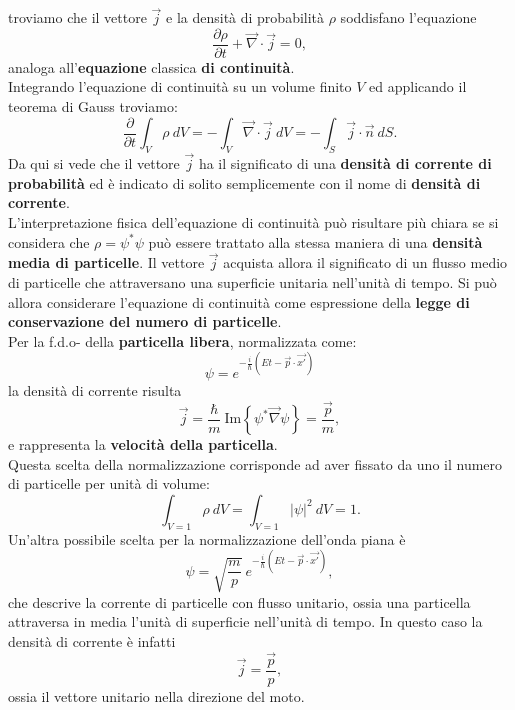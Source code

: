 \documentclass[a4paper,12pt,oneside]{book}
\begin{document}
troviamo che il vettore $\vec{j}$ e la densità di probabilità $\rho$ soddisfano l'equazione
\begin{equation}
\frac{\partial \rho}{\partial t}+ \vec{\nabla}\cdot\vec{j}=0,
\end{equation}
analoga all'\textbf{equazione} classica \textbf{di continuità}.\\
Integrando l'equazione di continuità su un volume finito $V$ ed applicando il teorema di Gauss troviamo:
\begin{equation}
\frac{\partial }{\partial t} \int _V \rho\ dV = - \int _V \vec{\nabla}\cdot\vec{j}\ dV = -\int _S \vec{j}\cdot\vec{n}\ dS.
\end{equation}
Da qui si vede che il vettore $\vec{j}$ ha il significato di una \textbf{densità di corrente di probabilità} ed è indicato di solito semplicemente con il nome di \textbf{densità di corrente}.\\
L'interpretazione fisica dell'equazione di continuità può risultare più chiara se si considera che $\rho= \psi^* \psi$ può essere trattato alla stessa maniera di una \textbf{densità media di particelle}. Il vettore $\vec{j}$ acquista allora il significato di un flusso medio di particelle che attraversano una superficie unitaria nell'unità di tempo. Si può allora considerare l'equazione di continuità come espressione della \textbf{legge di conservazione del numero di particelle}.\\
Per la f.d.o- della \textbf{particella libera}, normalizzata come:
\begin{equation}
\psi  =  e^{-\frac{i}{\hbar} (Et - \vec{p}\cdot \vec{x'})}
\end{equation}
la densità di corrente risulta
\begin{equation}
\vec{j}= \frac{\hbar}{m}\ \textrm{Im}\left\{\psi ^* \vec{\nabla}\psi \right\}= \frac{\vec{p}}{m},
\end{equation}
e rappresenta la \textbf{velocità della particella}.\\
Questa scelta della normalizzazione corrisponde ad aver fissato da uno il numero di particelle per unità di volume:
\begin{equation}
\int _{V=1} \rho \ dV = \int _{V=1} \vert \psi \vert ^2 \ dV=1.
\end{equation}
Un'altra possibile scelta per la normalizzazione dell'onda piana è
\begin{equation}
\psi  = \sqrt{\frac{m}{p}}\ e^{-\frac{i}{\hbar} (Et - \vec{p}\cdot \vec{x'})},
\end{equation}
che descrive la corrente di particelle con flusso unitario, ossia una particella attraversa in media l'unità di superficie nell'unità di tempo. In questo caso la densità di corrente è infatti
\begin{equation}
\vec{j}=  \frac{\vec{p}}{p},
\end{equation}
ossia il vettore unitario nella direzione del moto.
\end{document}
